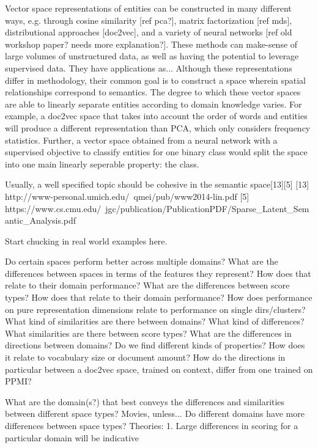 Vector space representations of entities can be constructed in many different ways, e.g. through cosine similarity [ref pca?], matrix factorization [ref mds], distributional approaches [doc2vec], and a variety of neural networks [ref old workshop paper? needs more explanation?]. These methods can make-sense of large volumes of unstructured data, %
as well as having the potential to leverage supervised data. %
They have applications as... %
Although these representations differ in methodology, their common goal is to construct a space wherein spatial relationships correspond to semantics. The degree to which these vector spaces are able to linearly separate entities according to domain knowledge varies. %
For example, a doc2vec space that takes into account the order of words and entities will produce a different representation than PCA, which only considers frequency statistics. Further, a vector space obtained from a neural network with a supervised objective to classify entities for one binary class would split the space into one main linearly seperable property: the class.


Usually, a well specified topic should be cohesive in the
semantic space[13][5] 
[13] http://www-personal.umich.edu/~qmei/pub/www2014-lin.pdf
[5] https://www.cs.cmu.edu/~jgc/publication/PublicationPDF/Sparse_Latent_Semantic_Analysis.pdf




Start chucking in real world examples here.

Do certain spaces perform better across multiple domains?
What are the differences between spaces in terms of the features they represent? How does that relate to their domain performance?
What are the differences between score types? How does that relate to their domain performance?
How does performance on pure representation dimensions relate to performance on single dirs/clusters?
What kind of similarities are there between domains? What kind of differences?
What similarities are there between score types?
What are the differences in directions between domains? Do we find different kinds of properties? How does it relate to vocabulary size or document amount?
How do the directions in particular between a doc2vec space, trained on context, differ from one trained on PPMI?


What are the domain(s?) that best conveys the differences and similarities between different space types?
Movies, unless...
Do different domains have more differences between space types? Theories:
1. Large differences in scoring for a particular domain will be indicative

